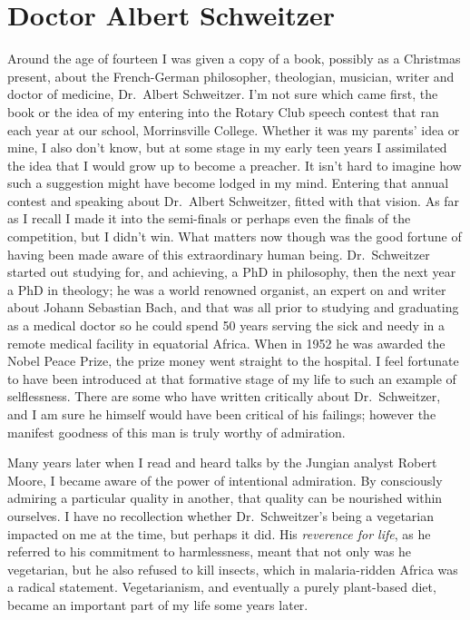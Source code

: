 \chapter{Doctor Albert Schweitzer}

Around the age of fourteen I was given a copy of a book, possibly as a
Christmas present, about the French-German philosopher, theologian,
musician, writer and doctor of medicine, Dr.~Albert Schweitzer\cite{schweitzer}.
I'm not sure which came first, the book or
the idea of my entering into the Rotary Club speech contest that ran
each year at our school, Morrinsville College. Whether it was my
parents' idea or mine, I also don't know, but at some stage in my early
teen years I assimilated the idea that I would grow up to become a
preacher. It isn't hard to imagine how such a suggestion might have
become lodged in my mind. Entering that annual contest and speaking
about Dr.~Albert Schweitzer, fitted with that vision. As far as I recall
I made it into the semi-finals or perhaps even the finals of the
competition, but I didn't win. What matters now though was the good
fortune of having been made aware of this extraordinary human being.
Dr.~Schweitzer started out studying for, and achieving, a PhD in philosophy,
then the next year a PhD in theology; he was a world renowned organist,
an expert on and writer about Johann Sebastian Bach, and that was all
prior to studying and graduating as a medical doctor so he could spend
50 years serving the sick and needy in a remote medical facility in
equatorial Africa. When in 1952 he was awarded the Nobel Peace Prize,
the prize money went straight to the hospital. I feel fortunate to have
been introduced at that formative stage of my life to such an example of
selflessness. There are some who have written critically about
Dr.~Schweitzer, and I am sure he himself would have been critical of his
failings; however the manifest goodness of this man is truly worthy of
admiration.

Many years later when I read and heard talks by the Jungian analyst
Robert Moore, I became aware of the power of intentional admiration. By
consciously admiring a particular quality in another, that quality can
be nourished within ourselves. I have no recollection whether
Dr.~Schweitzer's being a vegetarian impacted on me at the time, but perhaps
it did. His \emph{reverence for life}, as he referred to his commitment
to harmlessness, meant that not only was he vegetarian, but he also
refused to kill insects, which in malaria-ridden Africa was a radical
statement. Vegetarianism, and eventually a purely plant-based diet,
became an important part of my life some years later.


